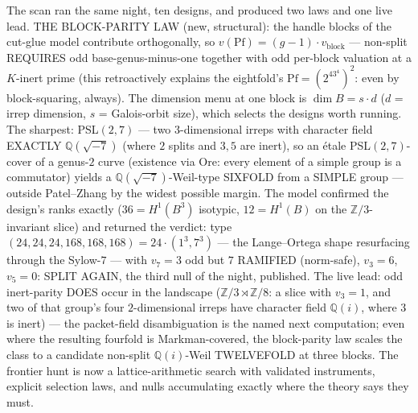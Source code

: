 \documentclass[11pt]{article}
\theoremstyle{definition}
\theoremstyle{remark}
\begin{document}
The scan ran the same night, ten designs, and produced two laws and
one live lead.  THE BLOCK-PARITY LAW (new, structural): the handle
blocks of the cut-glue model contribute orthogonally, so
$v(\mathrm{Pf})=(g-1)\cdot v_{\mathrm{block}}$ --- non-split REQUIRES
odd base-genus-minus-one together with odd per-block valuation at a
$K$-inert prime (this retroactively explains the eightfold's
$\mathrm{Pf}=(2^43^4)^2$: even by block-squaring, always).  The
dimension menu at one block is $\dim B=s\cdot d$ ($d$ = irrep
dimension, $s$ = Galois-orbit size), which selects the designs worth
running.  The sharpest: PSL$(2,7)$ --- two $3$-dimensional irreps
with character field EXACTLY $\mathbb{Q}(\sqrt{-7})$ (where $2$
splits and $3,5$ are inert), so an \'etale PSL$(2,7)$-cover of a
genus-$2$ curve (existence via Ore: every element of a simple group
is a commutator) yields a $\mathbb{Q}(\sqrt{-7})$-Weil-type SIXFOLD
from a SIMPLE group --- outside Patel--Zhang by the widest possible
margin.  The model confirmed the design's ranks exactly ($36=H^1(B^3)$
isotypic, $12=H^1(B)$ on the $\mathbb{Z}/3$-invariant slice) and
returned the verdict: type $(24,24,24,168,168,168)=24\cdot(1^3,7^3)$
--- the Lange--Ortega shape resurfacing through the Sylow-$7$ ---
with $v_7=3$ odd but $7$ RAMIFIED (norm-safe), $v_3=6$, $v_5=0$:
SPLIT AGAIN, the third null of the night, published.  The live lead:
odd inert-parity DOES occur in the landscape
($\mathbb{Z}/3{\rtimes}\mathbb{Z}/8$: a slice with $v_3=1$, and two
of that group's four $2$-dimensional irreps have character field
$\mathbb{Q}(i)$, where $3$ is inert) --- the packet-field
disambiguation is the named next computation; even where the
resulting fourfold is Markman-covered, the block-parity law scales
the class to a candidate non-split $\mathbb{Q}(i)$-Weil TWELVEFOLD
at three blocks.  The frontier hunt is now a lattice-arithmetic
search with validated instruments, explicit selection laws, and
nulls accumulating exactly where the theory says they must.
\end{document}
